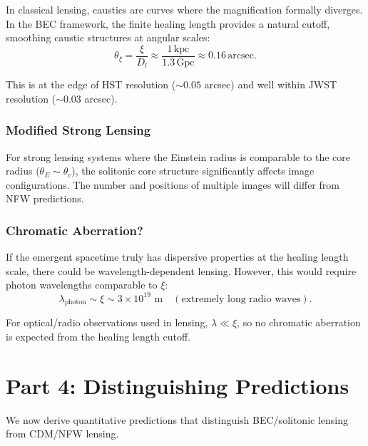 \documentclass[11pt,a4paper]{article}
\newcommand{\ee}[1]{\times 10^{#1}}
\newcommand{\kpc}{\ensuremath{\mathrm{kpc}}}
\newcommand{\arcsec}{\ensuremath{\mathrm{arcsec}}}
\theoremstyle{definition}
\theoremstyle{remark}
\begin{document}
In classical lensing, caustics are curves where the magnification formally diverges. In the BEC framework, the finite healing length provides a natural cutoff, smoothing caustic structures at angular scales:
\begin{equation}
\theta_\xi = \frac{\xi}{D_l} \approx \frac{1 \, \kpc}{1.3 \, \text{Gpc}} \approx 0.16 \, \arcsec.
\end{equation}

This is at the edge of HST resolution ($\sim 0.05$ arcsec) and well within JWST resolution ($\sim 0.03$ arcsec).

\subsubsection{Modified Strong Lensing}

For strong lensing systems where the Einstein radius is comparable to the core radius ($\theta_E \sim \theta_c$), the solitonic core structure significantly affects image configurations. The number and positions of multiple images will differ from NFW predictions.

\subsubsection{Chromatic Aberration?}

If the emergent spacetime truly has dispersive properties at the healing length scale, there could be wavelength-dependent lensing. However, this would require photon wavelengths comparable to $\xi$:
\begin{equation}
\lambda_{\mathrm{photon}} \sim \xi \sim 3 \ee{19} \text{ m} \quad (\text{extremely long radio waves}).
\end{equation}

For optical/radio observations used in lensing, $\lambda \ll \xi$, so no chromatic aberration is expected from the healing length cutoff.

\section{Part 4: Distinguishing Predictions}
\label{sec:predictions}

We now derive quantitative predictions that distinguish BEC/solitonic lensing from CDM/NFW lensing.
\end{document}
